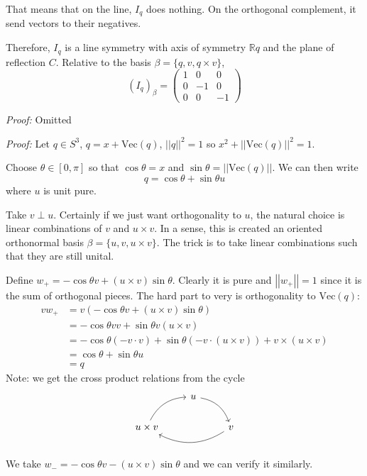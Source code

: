 \documentclass[12pt]{article}
\newcommand{\R}{\mathbb{R}}
\newcommand{\norm}[1]{\left\vert \left\vert #1 \right\vert \right\vert}
\renewcommand{\Vec}{\text{Vec}}
\newenvironment*{tbox}[2][gray]{
    \begin{tcolorbox}[
        parbox=false,
        colback=#1!5!white,
        colframe=#1!75!black,
        breakable,
        title={#2}
    ]}
    {\end{tcolorbox}}
\begin{document}
    That means that on the line, $I_q$ does nothing. On the orthogonal complement, it send vectors to their negatives. 

    Therefore, $I_q$ is a line symmetry with axis of symmetry $\R q$ and the plane of reflection $C$. Relative to the basis $\beta = \{q, v, q \times v\}$, 
    \[(I_q)_{\beta} = \begin{pmatrix}
        1 & 0 & 0\\ 
        0 & -1 & 0\\ 
        0 & 0 & -1
    \end{pmatrix}\]

    \begin{tbox}{\textbf{Cartan-Dieudonné Theorem:} Any isometry of $\R^n$ is expressible as a product of at most $(n+1)$-reflections in hyperplanes}
        \emph{Proof:} Omitted
    \end{tbox}

    \begin{tbox}{\textbf{Lemma:} Let $q \in S^3$ and choose $v$ that is pure and unit and orthogonal to $\Vec(q)$. Then there exists pure unit quaternions $w_+$ and $w_-$ so that 
        \[q = vw_+ = w_- v\]}
        \emph{Proof:} Let $q \in S^3$, $q = x + \Vec(q)$, $\norm{q}^2 = 1$ so $x^2 + \norm{\Vec(q)}^2 = 1$.
        
        Choose $\theta \in [0, \pi]$ so that $\cos \theta = x$ and $\sin \theta = \norm{\Vec(q)}$. We can then write 
        \[q = \cos \theta + \sin \theta u\]
        where $u$ is unit pure. 

        Take $v \perp u$. Certainly if we just want orthogonality to $u$, the natural choice is linear combinations of $v$ and $u \times v$. In a sense, this is created an oriented orthonormal basis $\beta = \{u, v, u \times v\}$. The trick is to take linear combinations such that they are still unital. 

        Define $w_+ = -\cos \theta v + (u \times v) \sin \theta$. Clearly it is pure and $\norm{w_+} = 1$ since it is the sum of orthogonal pieces. The hard part to very is orthogonality to $\Vec (q)$: 
        \begin{align*}
            vw_+ &= v(-\cos \theta v + (u \times v)\sin \theta) \\ 
            &= -\cos \theta vv + \sin \theta v(u \times v)\\ 
            &= -\cos \theta (-v \cdot v) + \sin \theta(-v \cdot (u \times v)) + v \times (u \times v)\\
            &= \cos \theta + \sin \theta u\\
            &= q
        \end{align*}
        Note: we get the cross product relations from the cycle 
        \[\begin{tikzcd}
            & u \arrow[bend left]{dr}\\ 
            u \times v \arrow[bend left]{ur} & & v \arrow[bend left]{ll}
        \end{tikzcd}\]

        We take $w_- = - \cos \theta v - (u \times v)\sin \theta$ and we can verify it similarly. 
    \end{tbox}
\end{document}
